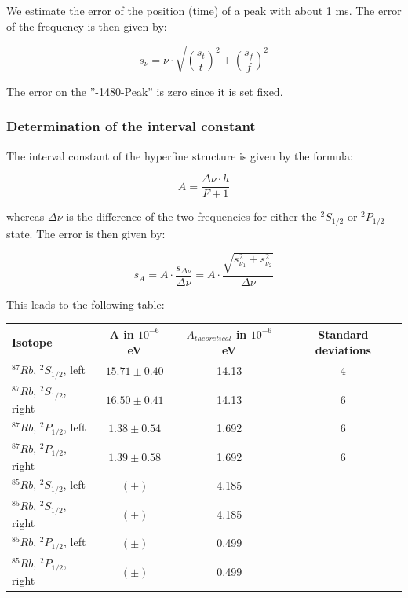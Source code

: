 We estimate the error of the position (time) of a peak with about 1 ms. The error of the frequency is then given by:

$$s_\nu = \nu\cdot\sqrt{\left(\frac{s_t}{t}\right)^2 + \left(\frac{s_f}{f}\right)^2}$$

The error on the ''-1480-Peak'' is zero since it is set fixed.

\subsubsection{Determination of the interval constant}

The interval constant of the hyperfine structure is given by the formula:

$$ A = \frac{\Delta\nu\cdot h}{F+1} $$

whereas $\Delta\nu$ is the difference of the two frequencies for either the $^2S_{1/2}$ or $^2P_{1/2}$ state. The error is then given by:

$$ s_A = A\cdot\frac{s_{\Delta\nu}}{\Delta\nu} = A\cdot\frac{\sqrt{s_{\nu_1}^2 + s_{\nu_2}^2}}{\Delta\nu} $$

This leads to the following table:

\begin{center}
\begin{tabular}[H]{l | c c c}
Isotope & A in $10^{-6}$ eV & $A_{theoretical}$ in $10^{-6}$ eV & Standard deviations\\ \hline
$^{87}Rb$, $^2S_{1/2}$, left & $ 15.71 \pm 0.40 $ & 14.13 	& 4 	\\ %
$^{87}Rb$, $^2S_{1/2}$, right & $ 16.50 \pm 0.41 $ & 14.13 	& 6	\\ %
$^{87}Rb$, $^2P_{1/2}$, left & $1.38 \pm 0.54 $ & 1.692 		& 6	\\ %
$^{87}Rb$, $^2P_{1/2}$, right & $ 1.39 \pm 0.58 $ & 1.692 	& 6	\\ %
$^{85}Rb$, $^2S_{1/2}$, left & $(\pm)$ & 4.185 \\
$^{85}Rb$, $^2S_{1/2}$, right & $(\pm)$ & 4.185 \\
$^{85}Rb$, $^2P_{1/2}$, left & $(\pm)$ & 0.499 \\
$^{85}Rb$, $^2P_{1/2}$, right & $(\pm)$ & 0.499 \\
\end{tabular}\\
\end{center}


